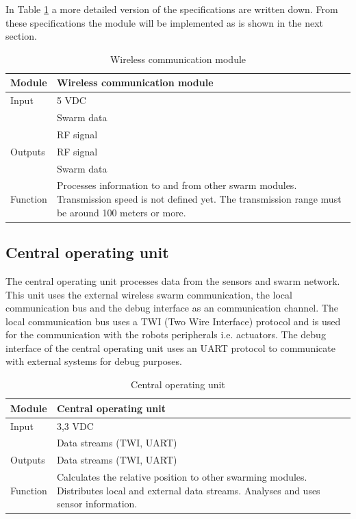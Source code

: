 \documentclass[10pt,a4paper]{article}
\begin{document}
In Table \ref{wcm} a more detailed version of the specifications are written down. From these specifications the module will be implemented as is shown in the next section. 

\begin{table}[H]
\centering
\caption{Wireless communication module}
\label{wcm}
\begin{tabular}{|p{}|p{}|}
\hline
Module   & Wireless communication module                                       \\ \hline
Input    & 5 VDC\\ 
        & Swarm data\\
        & RF signal                                              \\ \hline
Outputs  & RF signal                                           \\ 
& Swarm data \\ \hline
Function & Processes information to and from other swarm modules. Transmission speed is not defined yet. The transmission range must be around 100 meters or more. \\ \hline
\end{tabular}
\end{table}
\subsection{Central operating unit}
The central operating unit processes data from the sensors and swarm network. This unit uses the external wireless swarm communication, the local communication bus and the debug interface as an communication channel. The local communication bus uses a TWI (Two Wire Interface) protocol and is used for the communication with the robots peripherals i.e. actuators. The debug interface of the central operating unit uses an UART protocol to communicate with external systems for debug purposes.

\begin{table}[H]
\centering
\caption{Central operating unit}
\label{cou}
\begin{tabular}{|p{}|p{}|}
\hline
Module   & Central operating unit                                        \\ \hline
Input    & 3,3 VDC \\
         & Data streams (TWI, UART)                                           \\ \hline
Outputs  & Data streams (TWI, UART)                                             \\ \hline
Function & Calculates the relative position to other swarming modules. Distributes local and external data streams. Analyses and uses sensor information.\\ \hline
\end{tabular}
\end{table}
\end{document}
